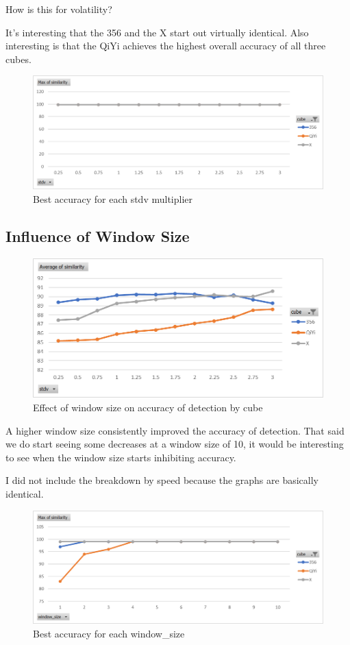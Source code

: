 How is this for volatility? 

It's interesting that the 356 and the X start out virtually identical.
Also interesting is that the QiYi achieves the highest overall accuracy
of all three cubes.


\begin{figure}[h]
    \centering
    \caption{Best accuracy for each stdv multiplier}
    \label{fig:max-similarity-by-stdv}
    \includegraphics[width=0.75\linewidth]{Figures/7 Evaluation/max_similarity_by_stdv.png}
\end{figure}

\subsection{Influence of Window Size}

\begin{figure}[h]
    \centering
    \caption{Effect of window size on accuracy of detection by cube}
    \label{fig:similarity-by-window-size}
    \includegraphics[width=0.75\linewidth]{Figures/7 Evaluation/similarity_by_cube.png}
\end{figure}

A higher window size consistently improved the accuracy of detection.
That said we do start seeing some decreases at a window size of 10, it
would be interesting to see when the window size starts inhibiting
accuracy.

I did not include the breakdown by speed because the graphs are
basically identical.

\begin{figure}[h]
    \centering
    \caption{Best accuracy for each window\_size}
    \label{fig:max-similarity-by-window-size}
    \includegraphics[width=0.75\linewidth]{Figures/7 Evaluation/max_similarity_by_window_size.png}
\end{figure}

